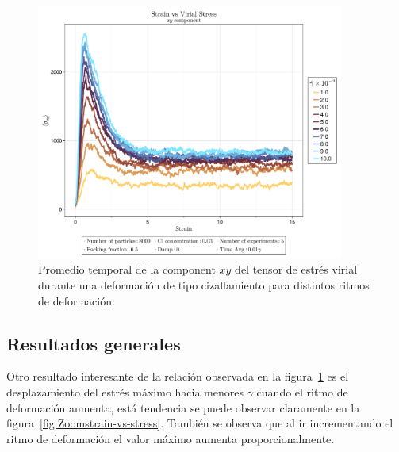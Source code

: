 \documentclass[../main.tex]{subfiles}
\begin{document}
\begin{figure}[h]
    \centering
    \includegraphics[width=0.9\textwidth]{../Figures/system-2025-05-22-194804-CL-0.03/Strain-vs-StressVirialXY.png}
    \caption{Promedio temporal de la component $xy$ del tensor de estrés virial durante una deformación de tipo cizallamiento para distintos ritmos de deformación.}\label{fig:strain-vs-stress}
\end{figure}

\subsection{Resultados generales}

Otro resultado interesante de la relación observada en la figura~\ref{fig:strain-vs-stress} es el desplazamiento del estrés máximo hacia menores $\gamma$ cuando el ritmo de deformación aumenta, está tendencia se puede observar claramente en la figura~\ref{fig:Zoomstrain-vs-stress}.
También se observa que al ir incrementando el ritmo de deformación el valor máximo aumenta proporcionalmente.
\end{document}
